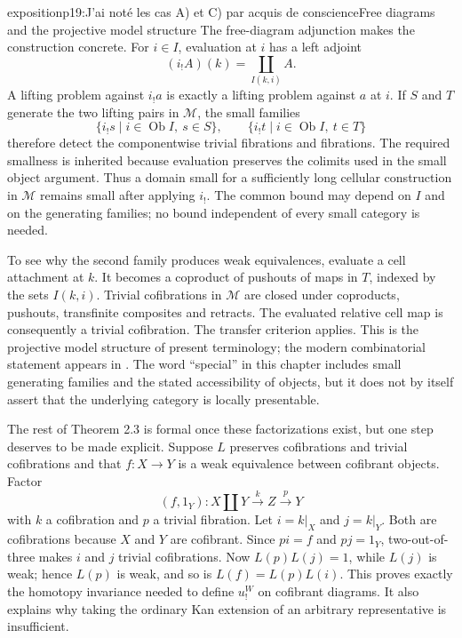 \begin{dcomment}{exposition}{p19:J'ai noté les cas A) et C) par acquis de conscience}{Free diagrams and the projective model structure}
The free-diagram adjunction makes the construction concrete. For $i\in I$, evaluation at $i$ has a left adjoint
\[
 (i_!A)(k)=\coprod_{I(k,i)}A.
\]
A lifting problem against $i_!a$ is exactly a lifting problem against $a$ at $i$. If $S$ and $T$ generate the two lifting pairs in $\mathcal M$, the small families
\[
 \{i_!s\mid i\in\operatorname{Ob}I,\ s\in S\},
 \qquad
 \{i_!t\mid i\in\operatorname{Ob}I,\ t\in T\}
\]
therefore detect the componentwise trivial fibrations and fibrations. The required smallness is inherited because evaluation preserves the colimits used in the small object argument. Thus a domain small for a sufficiently long cellular construction in $\mathcal M$ remains small after applying $i_!$. The common bound may depend on $I$ and on the generating families; no bound independent of every small category is needed.

To see why the second family produces weak equivalences, evaluate a cell attachment at $k$. It becomes a coproduct of pushouts of maps in $T$, indexed by the sets $I(k,i)$. Trivial cofibrations in $\mathcal M$ are closed under coproducts, pushouts, transfinite composites and retracts. The evaluated relative cell map is consequently a trivial cofibration. The transfer criterion applies. This is the projective model structure of present terminology; the modern combinatorial statement appears in \citet[Theorem~1.28]{Groth2013}. The word ``special'' in this chapter includes small generating families and the stated accessibility of objects, but it does not by itself assert that the underlying category is locally presentable.

The rest of Theorem 2.3 is formal once these factorizations exist, but one step deserves to be made explicit. Suppose $L$ preserves cofibrations and trivial cofibrations and that $f:X\to Y$ is a weak equivalence between cofibrant objects. Factor
\[
 (f,1_Y):X\amalg Y\xrightarrow{k}Z\xrightarrow{p}Y
\]
with $k$ a cofibration and $p$ a trivial fibration. Let $i=k|_X$ and $j=k|_Y$. Both are cofibrations because $X$ and $Y$ are cofibrant. Since $pi=f$ and $pj=1_Y$, two-out-of-three makes $i$ and $j$ trivial cofibrations. Now $L(p)L(j)=1$, while $L(j)$ is weak; hence $L(p)$ is weak, and so is $L(f)=L(p)L(i)$. This proves exactly the homotopy invariance needed to define $u_!^W$ on cofibrant diagrams. It also explains why taking the ordinary Kan extension of an arbitrary representative is insufficient.
\end{dcomment}

